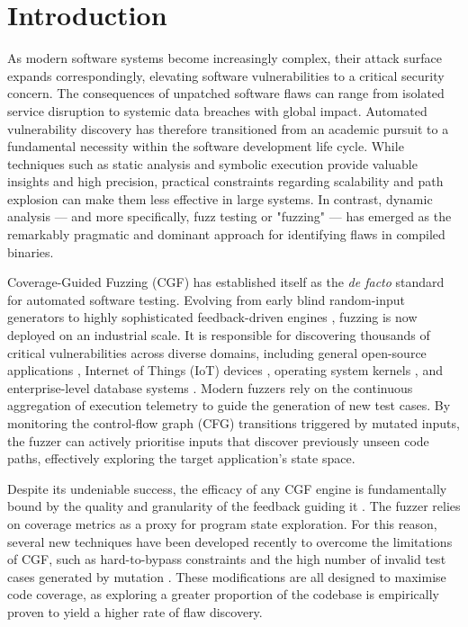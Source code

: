 \chapter{Introduction}
\label{chap:intro}

As modern software systems become increasingly complex, their attack surface expands correspondingly, elevating software vulnerabilities to a critical security concern. The consequences of unpatched software flaws can range from isolated service disruption to systemic data breaches with global impact. Automated vulnerability discovery has therefore transitioned from an academic pursuit to a fundamental necessity within the software development life cycle. While techniques such as static analysis \cite{nachtigall2022large} and symbolic execution \cite{baldoni2018survey, king1976symbolic} provide valuable insights and high precision, practical constraints regarding scalability and path explosion can make them less effective in large systems. In contrast, dynamic analysis --- and more specifically, fuzz testing or "fuzzing" --- has emerged as the remarkably pragmatic and dominant approach for identifying flaws in compiled binaries.

Coverage-Guided Fuzzing (CGF) has established itself as the \textit{de facto} standard for automated software testing. Evolving from early blind random-input generators \cite{miller1990empirical} to highly sophisticated feedback-driven engines \cite{fioraldi2020afl++, honggfuzz, libfuzzer}, fuzzing is now deployed on an industrial scale. It is responsible for discovering thousands of critical vulnerabilities across diverse domains, including general open-source applications \cite{ossfuzz}, Internet of Things (IoT) devices \cite{chen2018iotfuzzer, zheng2019firm}, operating system kernels \cite{syzkaller, xu2020krace}, and enterprise-level database systems \cite{jiang2023dynsql, liang2024wingfuzz, wang2021reinforcement}. Modern fuzzers rely on the continuous aggregation of execution telemetry to guide the generation of new test cases. By monitoring the control-flow graph (CFG) transitions triggered by mutated inputs, the fuzzer can actively prioritise inputs that discover previously unseen code paths, effectively exploring the target application's state space.

Despite its undeniable success, the efficacy of any CGF engine is fundamentally bound by the quality and granularity of the feedback guiding it \cite{wang2019sensitive}. The fuzzer relies on coverage metrics as a proxy for program state exploration. For this reason, several new techniques have been developed recently to overcome the limitations of CGF, such as hard-to-bypass constraints \cite{aschermann2019redqueen, poeplau2020symbolic, stephens2016driller, yun2018qsym} and the high number of invalid test cases generated by mutation \cite{aschermann2019nautilus, blazytko2019grimoire, fioraldi2020weizz, padhye2019semantic}. These modifications are all designed to maximise code coverage, as exploring a greater proportion of the codebase is empirically proven to yield a higher rate of flaw discovery.


